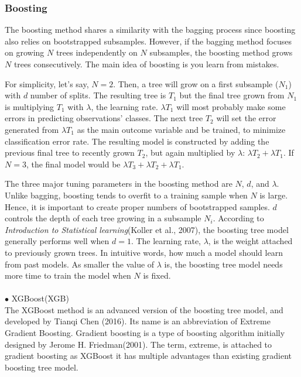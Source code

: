 \documentclass[11pt,a4paper,oneside]{article}
\begin{document}
\subsubsection{Boosting}
The boosting method shares a similarity with the bagging process since boosting also relies on bootstrapped subsamples. However, if the bagging method focuses on growing $N$ trees independently on $N$ subsamples, the boosting method grows $N$ trees consecutively. The main idea of boosting is you learn from mistakes. 
\par
For simplicity, let's say, $N=2$. Then, a tree will grow on a first subsample ($N_{1}$) with $d$ number of splits. The resulting tree is $T_{1}$ but the final tree grown from $N_{1}$ is multiplying $T_{1}$ with $\lambda$, the learning rate. $\lambda T_{1}$ will most probably make some errors in predicting observations' classes. The next tree $T_{2}$ will set the error generated from $\lambda T_{1}$ as the main outcome variable and be trained, to minimize classification error rate. The resulting model is constructed by adding the previous final tree to recently grown $T_{2}$, but again multiplied by $\lambda$: $\lambda T_{2} + \lambda T_{1}$. If $N=3$, the final model would be $\lambda T_{3} + \lambda T_{2} + \lambda T_{1}$.
\par
The three major tuning parameters in the boosting method are $N$, $d$, and $\lambda$. Unlike bagging, boosting tends to overfit to a training sample when $N$ is large. Hence, it is important to create proper numbers of bootstrapped samples. $d$ controls the depth of each tree growing in a subsample $N_{i}$. According to \emph{Introduction to Statistical learning}(Koller et al., 2007)\cite{koller2007introduction}, the boosting tree model generally performs well when $d=1$. The learning rate, $\lambda$, is the weight attached to previously grown trees. In intuitive words, how much a model should learn from past models. As smaller the value of $\lambda$ is, the boosting tree model needs more time to train the model when $N$ is fixed.
\\\\
$\bullet$ XGBoost(XGB)\\
The XGBoost method is an advanced version of the boosting tree model, and developed by Tianqi Chen (2016).\cite{chen2016xgboost} Its name is an abbreviation of Extreme Gradient Boosting. Gradient boosting is a type of boosting algorithm initially designed by Jerome H. Friedman(2001).\cite{friedman2001greedy} The term, extreme, is attached to gradient boosting as XGBoost it has multiple advantages than existing gradient boosting tree model.
\end{document}

